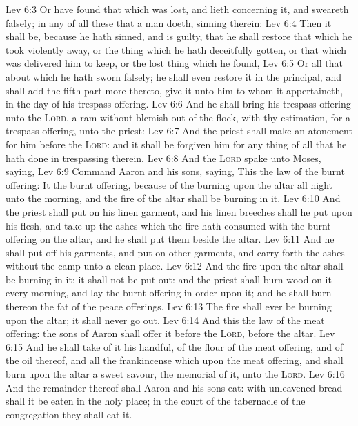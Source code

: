 \vs Lev 6:3 Or have found that which was lost, and lieth concerning it, and sweareth falsely; in any of all these that a man doeth, sinning therein:
\vs Lev 6:4 Then it shall be, because he hath sinned, and is guilty, that he shall restore that which he took violently away, or the thing which he hath deceitfully gotten, or that which was delivered him to keep, or the lost thing which he found,
\vs Lev 6:5 Or all that about which he hath sworn falsely; he shall even restore it in the principal, and shall add the fifth part more thereto,  give it unto him to whom it appertaineth, in the day of his trespass offering.
\vs Lev 6:6 And he shall bring his trespass offering unto the \textsc{Lord}, a ram without blemish out of the flock, with thy estimation, for a trespass offering, unto the priest:
\vs Lev 6:7 And the priest shall make an atonement for him before the \textsc{Lord}: and it shall be forgiven him for any thing of all that he hath done in trespassing therein.
\vs Lev 6:8 And the \textsc{Lord} spake unto Moses, saying,
\vs Lev 6:9 Command Aaron and his sons, saying, This  the law of the burnt offering: It  the burnt offering, because of the burning upon the altar all night unto the morning, and the fire of the altar shall be burning in it.
\vs Lev 6:10 And the priest shall put on his linen garment, and his linen breeches shall he put upon his flesh, and take up the ashes which the fire hath consumed with the burnt offering on the altar, and he shall put them beside the altar.
\vs Lev 6:11 And he shall put off his garments, and put on other garments, and carry forth the ashes without the camp unto a clean place.
\vs Lev 6:12 And the fire upon the altar shall be burning in it; it shall not be put out: and the priest shall burn wood on it every morning, and lay the burnt offering in order upon it; and he shall burn thereon the fat of the peace offerings.
\vs Lev 6:13 The fire shall ever be burning upon the altar; it shall never go out.
\vs Lev 6:14 And this  the law of the meat offering: the sons of Aaron shall offer it before the \textsc{Lord}, before the altar.
\vs Lev 6:15 And he shall take of it his handful, of the flour of the meat offering, and of the oil thereof, and all the frankincense which  upon the meat offering, and shall burn  upon the altar  a sweet savour,  the memorial of it, unto the \textsc{Lord}.
\vs Lev 6:16 And the remainder thereof shall Aaron and his sons eat: with unleavened bread shall it be eaten in the holy place; in the court of the tabernacle of the congregation they shall eat it.
